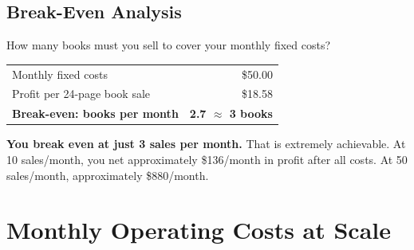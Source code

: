 \documentclass[12pt, letterpaper, oneside]{book}
\begin{document}
\section{Break-Even Analysis}

How many books must you sell to cover your monthly fixed costs?

\begin{table}[H]
\centering
\begin{tabular}{lr}
\toprule
Monthly fixed costs & \$50.00 \\
Profit per 24-page book sale & \$18.58 \\
\midrule
\textbf{Break-even: books per month} & \textbf{2.7 $\approx$ 3 books} \\
\bottomrule
\end{tabular}
\end{table}

\begin{successbox}
\textbf{You break even at just 3 sales per month.} That is extremely achievable. At 10 sales/month, you net approximately \$136/month in profit after all costs. At 50 sales/month, approximately \$880/month.
\end{successbox}


\chapter{Monthly Operating Costs at Scale}
\end{document}
